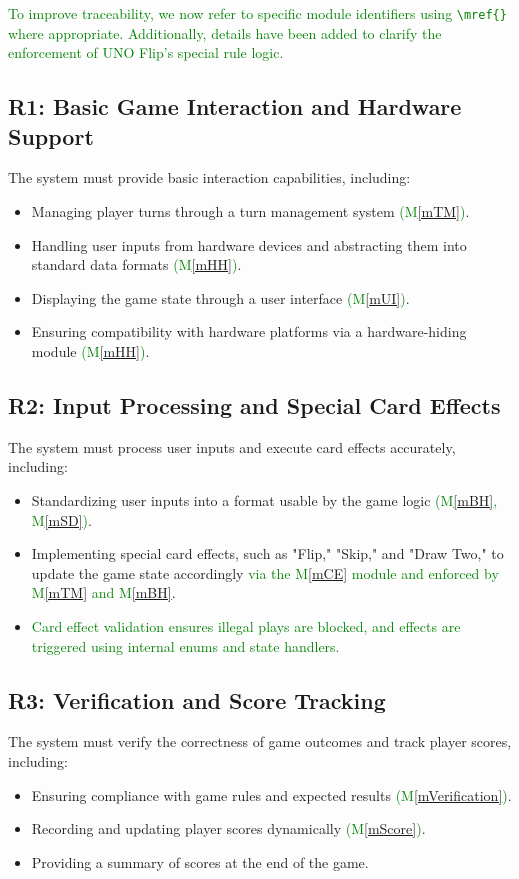 \documentclass[12pt, titlepage]{article}
\newcommand{\added}[1]{\textcolor{green}{#1}}
\newcommand{\mref}[1]{M\ref{#1}}
\begin{document}
\added{To improve traceability, we now refer to specific module identifiers using \texttt{\textbackslash mref\{\}} where appropriate. Additionally, details have been added to clarify the enforcement of UNO Flip's special rule logic.}

\subsection{R1: Basic Game Interaction and Hardware Support}
The system must provide basic interaction capabilities, including:
\begin{itemize}
    \item Managing player turns through a turn management system \added{(\mref{mTM})}.
    \item Handling user inputs from hardware devices and abstracting them into standard data formats \added{(\mref{mHH})}.
    \item Displaying the game state through a user interface \added{(\mref{mUI})}.
    \item Ensuring compatibility with hardware platforms via a hardware-hiding module \added{(\mref{mHH})}.
\end{itemize}

\subsection{R2: Input Processing and Special Card Effects}
The system must process user inputs and execute card effects accurately, including:
\begin{itemize}
    \item Standardizing user inputs into a format usable by the game logic \added{(\mref{mBH}, \mref{mSD})}.
    \item Implementing special card effects, such as "Flip," "Skip," and "Draw Two," to update the game state accordingly \added{via the \mref{mCE} module and enforced by \mref{mTM} and \mref{mBH}}.
    \item \added{Card effect validation ensures illegal plays are blocked, and effects are triggered using internal enums and state handlers.}
\end{itemize}

\subsection{R3: Verification and Score Tracking}
The system must verify the correctness of game outcomes and track player scores, including:
\begin{itemize}
    \item Ensuring compliance with game rules and expected results \added{(\mref{mVerification})}.
    \item Recording and updating player scores dynamically \added{(\mref{mScore})}.
    \item Providing a summary of scores at the end of the game.
\end{itemize}
\end{document}
